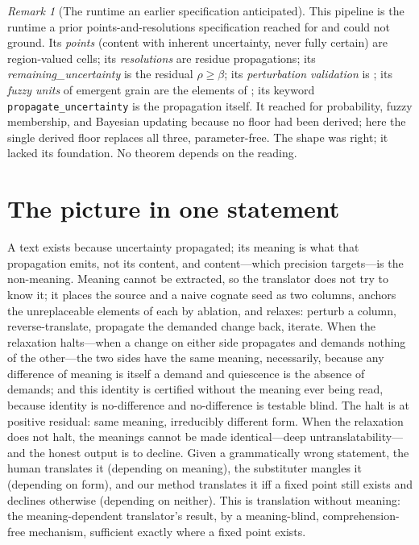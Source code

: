 \documentclass[11pt,a4paper]{article}
\theoremstyle{thmstyle}
\theoremstyle{definition}
\theoremstyle{remark}
\newtheorem{remark}[theorem]{Remark}
\newcommand{\flo}{\beta}               %
\newcommand{\res}{\rho}                %
\begin{document}
\begin{remark}[The runtime an earlier specification anticipated]
\label{rem:runtime}
This pipeline is the runtime a prior points-and-resolutions specification
reached for and could not ground. Its \emph{points} (content with inherent
uncertainty, never fully certain) are region-valued cells; its
\emph{resolutions} are residue propagations; its
\emph{remaining\_uncertainty} is the residual $\res\ge\flo$; its
\emph{perturbation validation} is ; its \emph{fuzzy units}
of emergent grain are the elements of ; its keyword
\texttt{propagate\_uncertainty} is the propagation itself. It reached for
probability, fuzzy membership, and Bayesian updating because no floor had been
derived; here the single derived floor replaces all three, parameter-free.
The shape was right; it lacked its foundation. No theorem depends on the
reading.
\end{remark}

\section{The picture in one statement}
\label{sec:picture}

A text exists because uncertainty propagated; its meaning is what that
propagation emits, not its content, and content---which precision targets---is
the non-meaning. Meaning cannot be extracted, so the translator does not try
to know it; it places the source and a naive cognate seed as two columns,
anchors the unreplaceable elements of each by ablation, and relaxes: perturb
a column, reverse-translate, propagate the demanded change back, iterate.
When the relaxation halts---when a change on either side propagates and
demands nothing of the other---the two sides have the same meaning,
necessarily, because any difference of meaning is itself a demand and
quiescence is the absence of demands; and this identity is certified without
the meaning ever being read, because identity is no-difference and
no-difference is testable blind. The halt is at positive residual: same
meaning, irreducibly different form. When the relaxation does not halt, the
meanings cannot be made identical---deep untranslatability---and the honest
output is to decline. Given a grammatically wrong statement, the human
translates it (depending on meaning), the substituter mangles it (depending on
form), and our method translates it iff a fixed point still exists and
declines otherwise (depending on neither). This is translation without
meaning: the meaning-dependent translator's result, by a meaning-blind,
comprehension-free mechanism, sufficient exactly where a fixed point exists.
\end{document}
